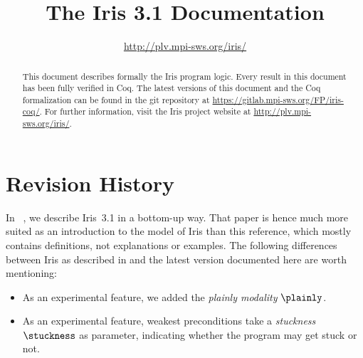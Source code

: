 \documentclass[10pt]{article}
\title{\bfseries The Iris 3.1 Documentation}
\author{\url{http://plv.mpi-sws.org/iris/}}
\begin{document}
\maketitle
\thispagestyle{empty}
\vfill
\begin{abstract}
This document describes formally the Iris program logic.
Every result in this document has been fully verified in Coq.
The latest versions of this document and the Coq formalization can be found in the git repository at \url{https://gitlab.mpi-sws.org/FP/iris-coq/}.
For further information, visit the Iris project website at \url{http://plv.mpi-sws.org/iris/}.
\end{abstract}

\clearpage\begingroup
\tableofcontents
\endgroup

\clearpage\begingroup
\section{Revision History}
In ~\cite{iris-ground-up}, we describe Iris~3.1 in a bottom-up way.
That paper is hence much more suited as an introduction to the model of Iris than this reference, which mostly contains definitions, not explanations or examples.
The following differences between Iris as described in  and the latest version documented here are worth mentioning:
\begin{itemize}
\item As an experimental feature, we added the \emph{plainly modality} $\plainly$.
\item As an experimental feature, weakest preconditions take a \emph{stuckness} $\stuckness$ as parameter, indicating whether the program may get stuck or not.
\end{itemize}
\endgroup

\clearpage\begingroup

\endgroup
\clearpage\begingroup

\endgroup
\clearpage\begingroup

\endgroup
\clearpage\begingroup

\endgroup
\clearpage\begingroup

\endgroup
\clearpage\begingroup

\endgroup
\clearpage\begingroup

\endgroup
\clearpage\begingroup

\endgroup
\clearpage\begingroup

\endgroup
\clearpage\begingroup
\printbibliography
\endgroup
\end{document}
